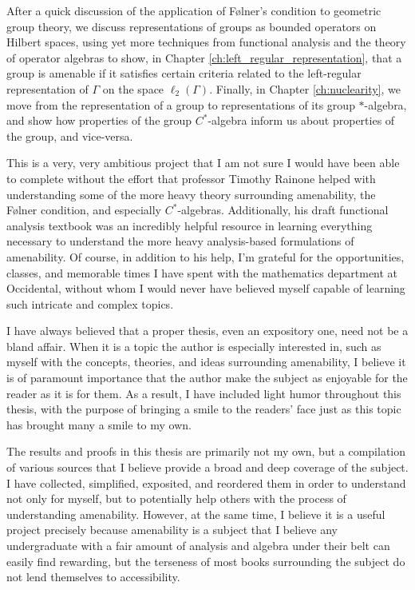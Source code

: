 \documentclass[10pt]{package2}
\begin{document}
After a quick discussion of the application of Følner's condition to geometric group theory, we discuss representations of groups as bounded operators on Hilbert spaces, using yet more techniques from functional analysis and the theory of operator algebras to show, in Chapter \ref{ch:left_regular_representation}, that a group is amenable if it satisfies certain criteria related to the left-regular representation of $\Gamma$ on the space $\ell_2\left(\Gamma\right)$. Finally, in Chapter \ref{ch:nuclearity}, we move from the representation of a group to representations of its group $\ast$-algebra, and show how properties of the group $C^{\ast}$-algebra inform us about properties of the group, and vice-versa.\newline

This is a very, very ambitious project that I am not sure I would have been able to complete without the effort that professor Timothy Rainone helped with understanding some of the more heavy theory surrounding amenability, the Følner condition, and especially $C^{\ast}$-algebras. Additionally, his draft functional analysis textbook was an incredibly helpful resource in learning everything necessary to understand the more heavy analysis-based formulations of amenability. Of course, in addition to his help, I'm grateful for the opportunities, classes, and memorable times I have spent with the mathematics department at Occidental, without whom I would never have believed myself capable of learning such intricate and complex topics.\newline

I have always believed that a proper thesis, even an expository one, need not be a bland affair. When it is a topic the author is especially interested in, such as myself with the concepts, theories, and ideas surrounding amenability, I believe it is of paramount importance that the author make the subject as enjoyable for the reader as it is for them. As a result, I have included light humor throughout this thesis, with the purpose of bringing a smile to the readers' face just as this topic has brought many a smile to my own.\newline

The results and proofs in this thesis are primarily not my own, but a compilation of various sources that I believe provide a broad and deep coverage of the subject. I have collected, simplified, exposited, and reordered them in order to understand not only for myself, but to potentially help others with the process of understanding amenability. However, at the same time, I believe it is a useful project precisely because amenability is a subject that I believe any undergraduate with a fair amount of analysis and algebra under their belt can easily find rewarding, but the terseness of most books surrounding the subject do not lend themselves to accessibility.\newline
\end{document}
